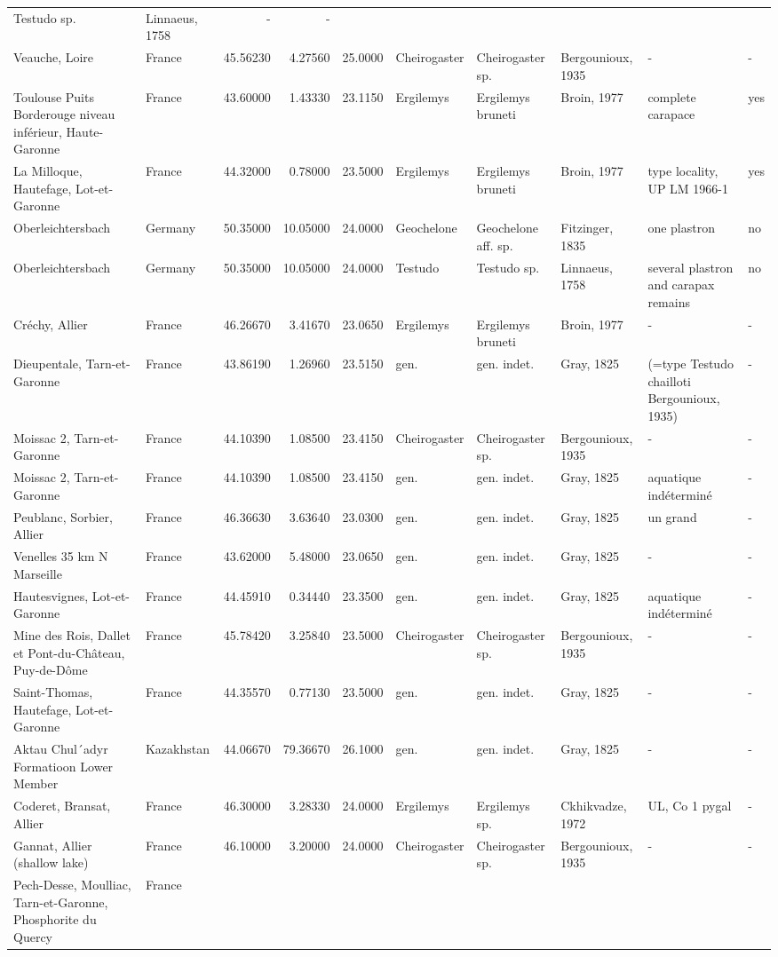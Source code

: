 \documentclass[]{article}
\begin{document}
\begin{longtable}[]{@{}llrrrlllll@{}}
Testudo sp. & Linnaeus, 1758 & - & -\tabularnewline
Veauche, Loire & France & 45.56230 & 4.27560 & 25.0000 & Cheirogaster &
Cheirogaster sp. & Bergounioux, 1935 & - & -\tabularnewline
Toulouse Puits Borderouge niveau inférieur, Haute-Garonne & France &
43.60000 & 1.43330 & 23.1150 & Ergilemys & Ergilemys bruneti & Broin,
1977 & complete carapace & yes\tabularnewline
La Milloque, Hautefage, Lot-et-Garonne & France & 44.32000 & 0.78000 &
23.5000 & Ergilemys & Ergilemys bruneti & Broin, 1977 & type locality,
UP LM 1966-1 & yes\tabularnewline
Oberleichtersbach & Germany & 50.35000 & 10.05000 & 24.0000 & Geochelone
& Geochelone aff. sp. & Fitzinger, 1835 & one plastron &
no\tabularnewline
Oberleichtersbach & Germany & 50.35000 & 10.05000 & 24.0000 & Testudo &
Testudo sp. & Linnaeus, 1758 & several plastron and carapax remains &
no\tabularnewline
Créchy, Allier & France & 46.26670 & 3.41670 & 23.0650 & Ergilemys &
Ergilemys bruneti & Broin, 1977 & - & -\tabularnewline
Dieupentale, Tarn-et-Garonne & France & 43.86190 & 1.26960 & 23.5150 &
gen. & gen. indet. & Gray, 1825 & (=type Testudo chailloti Bergounioux,
1935) & -\tabularnewline
Moissac 2, Tarn-et-Garonne & France & 44.10390 & 1.08500 & 23.4150 &
Cheirogaster & Cheirogaster sp. & Bergounioux, 1935 & - &
-\tabularnewline
Moissac 2, Tarn-et-Garonne & France & 44.10390 & 1.08500 & 23.4150 &
gen. & gen. indet. & Gray, 1825 & aquatique indéterminé &
-\tabularnewline
Peublanc, Sorbier, Allier & France & 46.36630 & 3.63640 & 23.0300 & gen.
& gen. indet. & Gray, 1825 & un grand & -\tabularnewline
Venelles 35 km N Marseille & France & 43.62000 & 5.48000 & 23.0650 &
gen. & gen. indet. & Gray, 1825 & - & -\tabularnewline
Hautesvignes, Lot-et-Garonne & France & 44.45910 & 0.34440 & 23.3500 &
gen. & gen. indet. & Gray, 1825 & aquatique indéterminé &
-\tabularnewline
Mine des Rois, Dallet et Pont-du-Château, Puy-de-Dôme & France &
45.78420 & 3.25840 & 23.5000 & Cheirogaster & Cheirogaster sp. &
Bergounioux, 1935 & - & -\tabularnewline
Saint-Thomas, Hautefage, Lot-et-Garonne & France & 44.35570 & 0.77130 &
23.5000 & gen. & gen. indet. & Gray, 1825 & - & -\tabularnewline
Aktau Chul´adyr Formatioon Lower Member & Kazakhstan & 44.06670 &
79.36670 & 26.1000 & gen. & gen. indet. & Gray, 1825 & - &
-\tabularnewline
Coderet, Bransat, Allier & France & 46.30000 & 3.28330 & 24.0000 &
Ergilemys & Ergilemys sp. & Ckhikvadze, 1972 & UL, Co 1 pygal &
-\tabularnewline
Gannat, Allier (shallow lake) & France & 46.10000 & 3.20000 & 24.0000 &
Cheirogaster & Cheirogaster sp. & Bergounioux, 1935 & - &
-\tabularnewline
Pech-Desse, Moulliac, Tarn-et-Garonne, Phosphorite du Quercy & France &

\end{longtable}
\end{document}
